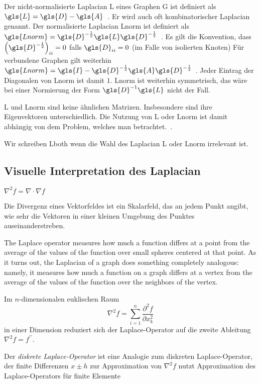Der nicht-normalisierte Laplacian \gls{L} eines Graphen \gls{G} ist definiert als $\gls{L} = \gls{D} - \gls{A}$~\cite{Chung}.
Er wird auch oft kombinatorischer Laplacian genannt.
Der normalisierte Laplacian \gls{Lnorm} ist definiert als $\gls{Lnorm} = \gls{D}^{-\frac{1}{2}} \gls{L} \gls{D}^{-\frac{1}{2}}$~\cite{Chung}.
Es gilt die Konvention, dass ${\left(\gls{D}^{-\frac{1}{2}}\right)}_{ii} = 0$ falls $\gls{D}_{ii} = 0$ (im Falle von isolierten Knoten)
Für verbundene Graphen gilt weiterhin $\gls{Lnorm} = \gls{I} - \gls{D}^{-\frac{1}{2}} \gls{A} \gls{D}^{-\frac{1}{2}}$~\cite{Chung}.
Jeder Eintrag der Diagonalen von \gls{Lnorm} ist damit $1$.
\gls{Lnorm} ist weiterhin symmetrisch, das wäre bei einer Normierung der Form $\gls{D}^{-1}\gls{L}$ nicht der Fall.

\gls{L} und \gls{Lnorm} sind keine ähnlichen Matrizen.
Insbesondere sind ihre Eigenvektoren unterschiedlich.
Die Nutzung von \gls{L} oder \gls{Lnorm} ist damit abhängig von dem Problem, welches man betrachtet.~\cite{Hammond}.

Wir schreiben \gls{Lboth} wenn die Wahl des Laplacian \gls{L} oder \gls{Lnorm} irrelevant ist.

\subsection{Visuelle Interpretation des Laplacian}

$\nabla^2 f = \nabla \cdot \nabla f$

Die Divergenz eines Vektorfeldes ist ein Skalarfeld, das an jedem Punkt angibt, wie sehr die Vektoren in einer kleinen Umgebung des Punktes auseinanderstreben.

The Laplace operator measures how much a function differs at a point from the average of the values of the function over small spheres centered at that point. As it turns out, the Laplacian of a graph does something completely analogous: namely, it measures how much a function on a graph differs at a vertex from the average of the values of the function over the neighbors of the vertex.

Im $n$-dimensionalen euklischen Raum
\begin{equation}
  \nabla^2f = \sum_{i=1}^n \frac{\partial^2f}{\partial x^2_k}
\end{equation}
in einer Dimension reduziert sich der Laplace-Operator auf die zweite Ableitung $\nabla^2 f = f^{\prime\prime}$.

Der \emph{diskrete Laplace-Operator} ist eine Analogie zum diskreten Laplace-Operator, der finite Differenzen $x \pm h$ zur Approximation von $\nabla^2 f$ nutzt
 Approximation des Laplace-Operators für finite Elemente

